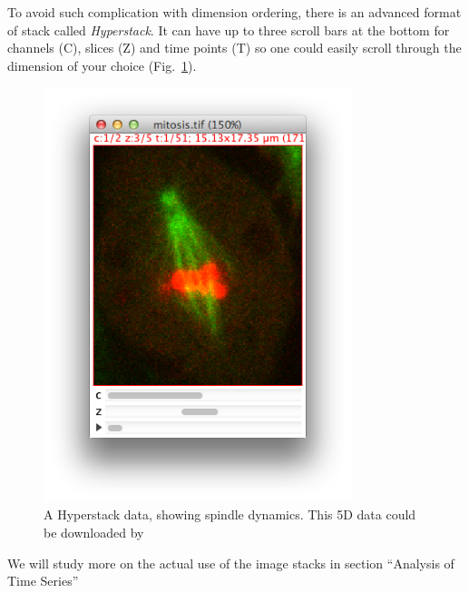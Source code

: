 To avoid such complication with dimension ordering, there is an advanced format of stack called \textit{Hyperstack}. It can have up to three scroll bars at the bottom for channels (C), slices (Z) and time points (T) so one could easily scroll through the dimension of your choice (Fig.~\ref{fig:heyperstack_mitosis}). 

\begin{figure}[h!]
\begin{center}
\includegraphics[width=9cm]{fig/Hyperstack_Mitosis.png}
\caption{ A Hyperstack data, showing spindle dynamics. This 5D data could be downloaded by }
\label{fig:heyperstack_mitosis}
\end{center}
\end{figure}

We will study more on the actual use of the image stacks in section ``Analysis of Time Series''%

